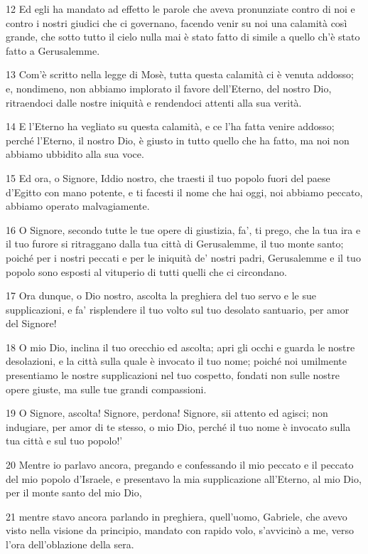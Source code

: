 \par 12 Ed egli ha mandato ad effetto le parole che aveva pronunziate contro di noi e contro i nostri giudici che ci governano, facendo venir su noi una calamità così grande, che sotto tutto il cielo nulla mai è stato fatto di simile a quello ch'è stato fatto a Gerusalemme.
\par 13 Com'è scritto nella legge di Mosè, tutta questa calamità ci è venuta addosso; e, nondimeno, non abbiamo implorato il favore dell'Eterno, del nostro Dio, ritraendoci dalle nostre iniquità e rendendoci attenti alla sua verità.
\par 14 E l'Eterno ha vegliato su questa calamità, e ce l'ha fatta venire addosso; perché l'Eterno, il nostro Dio, è giusto in tutto quello che ha fatto, ma noi non abbiamo ubbidito alla sua voce.
\par 15 Ed ora, o Signore, Iddio nostro, che traesti il tuo popolo fuori del paese d'Egitto con mano potente, e ti facesti il nome che hai oggi, noi abbiamo peccato, abbiamo operato malvagiamente.
\par 16 O Signore, secondo tutte le tue opere di giustizia, fa', ti prego, che la tua ira e il tuo furore si ritraggano dalla tua città di Gerusalemme, il tuo monte santo; poiché per i nostri peccati e per le iniquità de' nostri padri, Gerusalemme e il tuo popolo sono esposti al vituperio di tutti quelli che ci circondano.
\par 17 Ora dunque, o Dio nostro, ascolta la preghiera del tuo servo e le sue supplicazioni, e fa' risplendere il tuo volto sul tuo desolato santuario, per amor del Signore!
\par 18 O mio Dio, inclina il tuo orecchio ed ascolta; apri gli occhi e guarda le nostre desolazioni, e la città sulla quale è invocato il tuo nome; poiché noi umilmente presentiamo le nostre supplicazioni nel tuo cospetto, fondati non sulle nostre opere giuste, ma sulle tue grandi compassioni.
\par 19 O Signore, ascolta! Signore, perdona! Signore, sii attento ed agisci; non indugiare, per amor di te stesso, o mio Dio, perché il tuo nome è invocato sulla tua città e sul tuo popolo!'
\par 20 Mentre io parlavo ancora, pregando e confessando il mio peccato e il peccato del mio popolo d'Israele, e presentavo la mia supplicazione all'Eterno, al mio Dio, per il monte santo del mio Dio,
\par 21 mentre stavo ancora parlando in preghiera, quell'uomo, Gabriele, che avevo visto nella visione da principio, mandato con rapido volo, s'avvicinò a me, verso l'ora dell'oblazione della sera.
